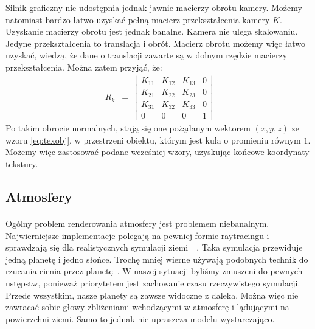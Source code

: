 Silnik graficzny nie udostępnia jednak jawnie macierzy obrotu kamery. Możemy natomiast bardzo łatwo uzyskać pełną macierz przekształcenia kamery $K$. Uzyskanie macierzy obrotu jest jednak banalne. Kamera nie ulega skalowaniu. Jedyne przekształcenia to translacja i obrót. Macierz obrotu możemy więc łatwo uzyskać, wiedzą, że dane o translacji zawarte są w dolnym rzędzie macierzy przekształcenia. Można zatem przyjąć, że:
\begin{eqnarray}
R_k &=&  
\left| \begin{array}{cccc}
K_{11} & K_{12} & K_{13} & 0 \\ 
K_{21} & K_{22} & K_{23} & 0 \\
K_{31} & K_{32} & K_{33} & 0 \\
0 & 0 & 0 & 1 
\end{array} \right|
\end{eqnarray}
Po takim obrocie normalnych, stają się one pożądanym wektorem $(x,y,z)$ ze wzoru \hyperref[eq:texobj]{\ref{eq:texobj}}, w przestrzeni obiektu, którym jest kula o promieniu równym $1$. Możemy więc zastosować podane wcześniej wzory, uzyskując końcowe koordynaty tekstury.

\subsection{Atmosfery}\label{sub:atmosfery}
\paragraph{}

Ogólny problem renderowania atmosfery jest problemem niebanalnym. Najwierniejsze implementacje polegają na pewniej formie raytracingu i sprawdzają się dla realistycznych symulacji ziemi~\cite{burneton:atmo}~\cite{gpugems:atmo}. Taka symulacja przewiduje jedną planetę i jedno słońce. Trochę mniej wierne używają podobnych technik do rzucania cienia przez planetę~\cite{josth:atmo}. W naszej sytuacji byliśmy zmuszeni do pewnych ustępstw, ponieważ priorytetem jest zachowanie czasu rzeczywistego symulacji. Przede wszystkim, nasze planety są zawsze widoczne z daleka. Można więc nie zawracać sobie głowy zbliżeniami wchodzącymi w atmosferę i lądującymi na powierzchni ziemi. Samo to jednak nie upraszcza modelu wystarczająco.

\paragraph{}

